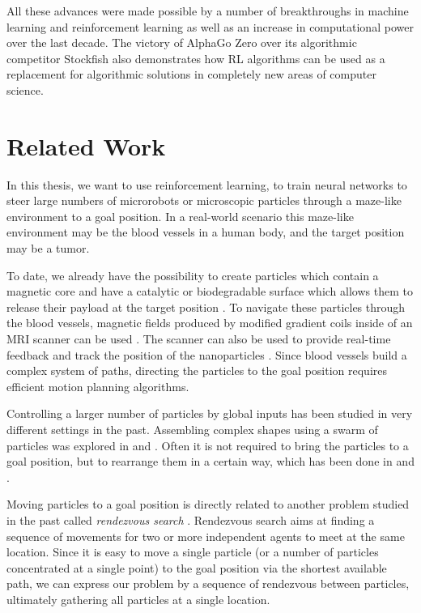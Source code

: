  All these advances were made possible by a number of breakthroughs in machine learning and reinforcement learning as well as an increase in computational power over the last decade. The victory of AlphaGo Zero over its algorithmic competitor Stockfish also demonstrates how RL algorithms can be used as a replacement for algorithmic solutions in completely new areas of computer science. 


\section{Related Work} \label{sec:RelatedWork}
In this thesis, we want to use reinforcement learning, to train neural networks to steer large numbers of microrobots or microscopic particles through a maze-like environment to a goal position. In a real-world scenario this maze-like environment may be the blood vessels in a human body, and the target position may be a tumor. 

To date, we already have the possibility to create particles which contain a magnetic core and have a catalytic or biodegradable surface which allows them to release their payload at the target position \cite{litvinov2012high, mellal2015magnetic}. To navigate these particles through the blood vessels, magnetic fields produced by modified gradient coils inside of an MRI scanner can be used \cite{mathieu2007magnetic, mathieu2010steering}. The scanner can also be used to provide real-time feedback and track the position of the nanoparticles \cite{pouponneau2009magnetic}. Since blood vessels build a complex system of paths, directing the particles to the goal position requires efficient motion planning algorithms. 

Controlling a larger number of particles by global inputs has been studied in very different settings in the past. Assembling complex shapes using a swarm of particles was explored in \cite{becker2018tilt} and \cite{balanza2019full}. Often it is not required to bring the particles to a goal position, but to rearrange them in a certain way, which has been done in \cite{becker2013massive} and \cite{zhang2017rearranging}. 

Moving particles to a goal position is directly related to another problem studied in the past called \textit{rendezvous search} \cite{alpern2006theory}. Rendezvous search aims at finding a sequence of movements for two or more independent agents to meet at the same location. Since it is easy to move a single particle (or a number of particles concentrated at a single point) to the goal position via the shortest available path, we can express our problem by a sequence of rendezvous between particles, ultimately gathering all particles at a single location.

